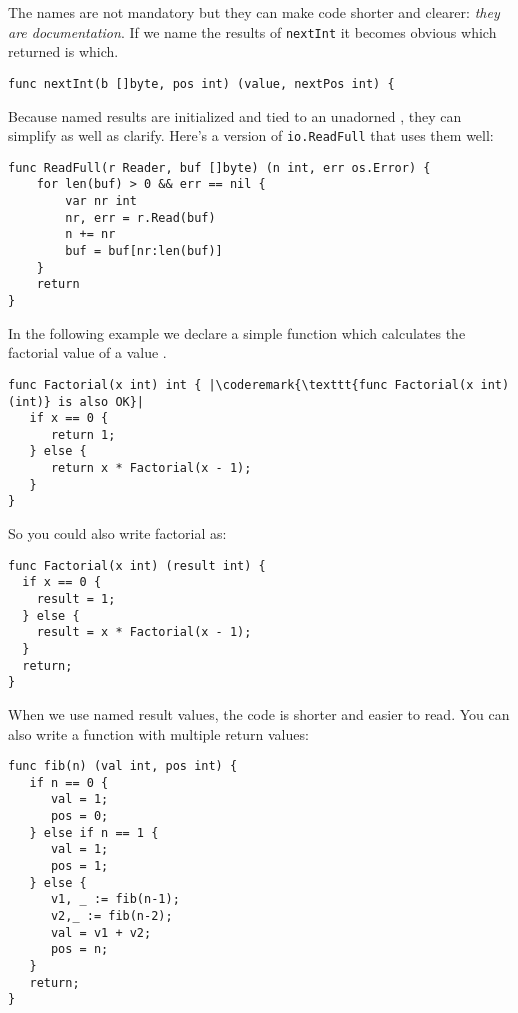 The names are not mandatory but they can make code shorter and clearer:
\emph{they are documentation}. 
If we name the results of \lstinline{nextInt} it becomes obvious which
returned  is which.

\begin{lstlisting}
func nextInt(b []byte, pos int) (value, nextPos int) {
\end{lstlisting}
Because named results are initialized and tied to an unadorned
,
they can simplify as well as clarify. Here's a version of
\lstinline{io.ReadFull} that uses them well:

\begin{lstlisting}
func ReadFull(r Reader, buf []byte) (n int, err os.Error) {
    for len(buf) > 0 && err == nil {
        var nr int
        nr, err = r.Read(buf)
        n += nr
        buf = buf[nr:len(buf)]
    }
    return
}
\end{lstlisting}

In the following example we declare a simple function which calculates
the factorial value of a value .

\begin{lstlisting}
func Factorial(x int) int { |\coderemark{\texttt{func Factorial(x int) (int)} is also OK}|
   if x == 0 {
      return 1;	
   } else {
      return x * Factorial(x - 1);
   }
}
\end{lstlisting}
So you could also write factorial as:
\begin{lstlisting}
func Factorial(x int) (result int) {
  if x == 0 {
    result = 1;	
  } else {
    result = x * Factorial(x - 1);
  }
  return;
}
\end{lstlisting}
When we use named result values, the code is shorter and
easier to read.
You can also write a function with multiple return values:
\begin{lstlisting}
func fib(n) (val int, pos int) {
   if n == 0 {
      val = 1;
      pos = 0;
   } else if n == 1 {
      val = 1;
      pos = 1;
   } else {
      v1, _ := fib(n-1);
      v2,_ := fib(n-2);
      val = v1 + v2;
      pos = n;
   }
   return;
}
\end{lstlisting}

